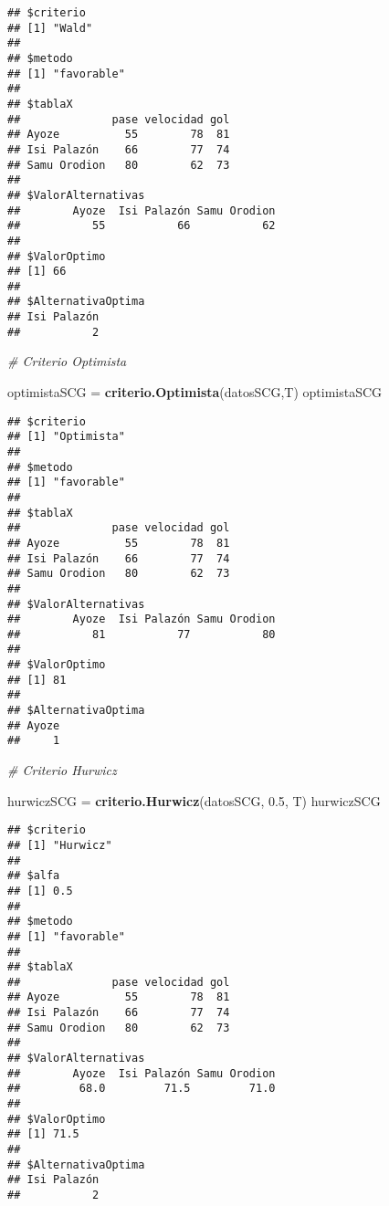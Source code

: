 \documentclass[
]{article}
\newenvironment{Shaded}{\begin{snugshade}}{\end{snugshade}}
\newcommand{\CommentTok}[1]{\textcolor[rgb]{0.56,0.35,0.01}{\textit{#1}}}
\newcommand{\FloatTok}[1]{\textcolor[rgb]{0.00,0.00,0.81}{#1}}
\newcommand{\FunctionTok}[1]{\textcolor[rgb]{0.13,0.29,0.53}{\textbf{#1}}}
\newcommand{\NormalTok}[1]{#1}
\newcommand{\OtherTok}[1]{\textcolor[rgb]{0.56,0.35,0.01}{#1}}
\begin{document}
\begin{verbatim}
## $criterio
## [1] "Wald"
## 
## $metodo
## [1] "favorable"
## 
## $tablaX
##              pase velocidad gol
## Ayoze          55        78  81
## Isi Palazón    66        77  74
## Samu Orodion   80        62  73
## 
## $ValorAlternativas
##        Ayoze  Isi Palazón Samu Orodion 
##           55           66           62 
## 
## $ValorOptimo
## [1] 66
## 
## $AlternativaOptima
## Isi Palazón 
##           2
\end{verbatim}

\begin{Shaded}
\begin{Highlighting}[]
\CommentTok{\# Criterio Optimista}

\NormalTok{optimistaSCG }\OtherTok{=} \FunctionTok{criterio.Optimista}\NormalTok{(datosSCG,T)}
\NormalTok{optimistaSCG}
\end{Highlighting}
\end{Shaded}

\begin{verbatim}
## $criterio
## [1] "Optimista"
## 
## $metodo
## [1] "favorable"
## 
## $tablaX
##              pase velocidad gol
## Ayoze          55        78  81
## Isi Palazón    66        77  74
## Samu Orodion   80        62  73
## 
## $ValorAlternativas
##        Ayoze  Isi Palazón Samu Orodion 
##           81           77           80 
## 
## $ValorOptimo
## [1] 81
## 
## $AlternativaOptima
## Ayoze 
##     1
\end{verbatim}

\begin{Shaded}
\begin{Highlighting}[]
\CommentTok{\# Criterio Hurwicz}

\NormalTok{hurwiczSCG }\OtherTok{=} \FunctionTok{criterio.Hurwicz}\NormalTok{(datosSCG, }\FloatTok{0.5}\NormalTok{, T)}
\NormalTok{hurwiczSCG}
\end{Highlighting}
\end{Shaded}

\begin{verbatim}
## $criterio
## [1] "Hurwicz"
## 
## $alfa
## [1] 0.5
## 
## $metodo
## [1] "favorable"
## 
## $tablaX
##              pase velocidad gol
## Ayoze          55        78  81
## Isi Palazón    66        77  74
## Samu Orodion   80        62  73
## 
## $ValorAlternativas
##        Ayoze  Isi Palazón Samu Orodion 
##         68.0         71.5         71.0 
## 
## $ValorOptimo
## [1] 71.5
## 
## $AlternativaOptima
## Isi Palazón 
##           2
\end{verbatim}
\end{document}
